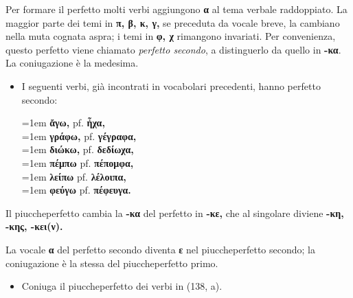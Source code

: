 \documentclass[nols]{tufte-handout}
\newcommand{\textls}[2][5]{%
    \begingroup\addfontfeatures{LetterSpace=#1}#2\endgroup
  }
\renewcommand{\smallcapsspacing}[1]{\textls[10]{#1}}
\renewcommand{\textsc}[1]{\smallcapsspacing{\textsmallcaps{#1}}}
\begin{document}
 Per formare il perfetto molti verbi aggiungono \textbf{α} al tema verbale raddoppiato. La maggior parte dei temi in \textbf{π, β, κ, γ,} se preceduta da vocale breve, la cambiano nella muta cognata aspra; i temi in \textbf{φ, χ} rimangono invariati. Per convenienza, questo perfetto viene chiamato \textit{perfetto secondo}, a distinguerlo da quello in \textbf{-κα}. La coniugazione è la medesima.
\begin{itemize}
\item[\textsc{a.}] I seguenti verbi, già incontrati in vocabolari precedenti, hanno perfetto secondo:
\begin{multicols}{2}
    \noindent \hangindent=1em \textbf{ἄγω,} pf. \textbf{ἦχα,}  \\
	\noindent \hangindent=1em \textbf{γράφω,} pf. \textbf{γέγραφα,}  \\
	\noindent \hangindent=1em \textbf{διώκω,} pf. \textbf{δεδίωχα,}  \\
	
	\noindent \hangindent=1em \textbf{πέμπω} pf. \textbf{πέπομφα,}  \\
	\noindent \hangindent=1em \textbf{λείπω} pf. \textbf{λέλοιπα,}  \\
	\noindent \hangindent=1em \textbf{φεύγω} pf. \textbf{πέφευγα.} 
\end{multicols}
\end{itemize}

 Il piuccheperfetto cambia la \textbf{-κα} del perfetto in \textbf{-κε,} che al singolare diviene \textbf{-κη, -κης, -κει(ν).}

 La vocale \textbf{α} del perfetto secondo diventa \textbf{ε} nel piuccheperfetto secondo; la coniugazione è la stessa del piuccheperfetto primo.

\begin{itemize}
\item[\textsc{a.}] Coniuga il piuccheperfetto dei verbi in (138, a). 
\end{itemize}

\end{document}
